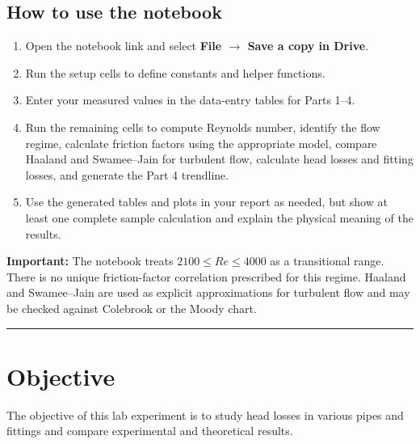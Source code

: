 \documentclass[12pt,letterpaper]{article}
\begin{document}
\subsection*{How to use the notebook}
\begin{enumerate}[leftmargin=*, label=\arabic*.]
    \item Open the notebook link and select \textbf{File $\to$ Save a copy in Drive}.
    \item Run the setup cells to define constants and helper functions.
    \item Enter your measured values in the data-entry tables for Parts 1--4.
    \item Run the remaining cells to compute Reynolds number, identify the flow regime, calculate friction factors using the appropriate model, compare Haaland and Swamee--Jain for turbulent flow, calculate head losses and fitting losses, and generate the Part 4 trendline.
    \item Use the generated tables and plots in your report as needed, but show at least one complete sample calculation and explain the physical meaning of the results.
\end{enumerate}

\noindent\textbf{Important:} The notebook treats \(2100 \le Re \le 4000\) as a transitional range. There is no unique friction-factor correlation prescribed for this regime. Haaland and Swamee--Jain are used as explicit approximations for turbulent flow and may be checked against Colebrook or the Moody chart.

\vspace{1em}
\hrule
\vspace{1em}

\section{Objective}
The objective of this lab experiment is to study head losses in various pipes and fittings and compare experimental and theoretical results.
\end{document}
